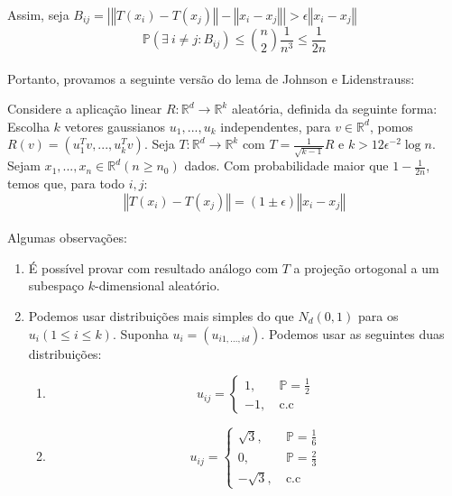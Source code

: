 \paragraph{}Assim, seja $B_{ij} = \left\vert \left\Vert T(x_i) - T(x_j) \right\Vert - \left\Vert x_i - x_j \right\Vert \right\vert > \epsilon\left\Vert x_i - x_j \right\Vert$
\begin{equation*}
    \mathbb{P}(\exists\> i \neq j : B_{ij}) \leq \binom{n}{2}\frac{1}{n^3} \leq \frac{1}{2n}
\end{equation*}
\paragraph{}Portanto, provamos a seguinte versão do lema de Johnson e Lidenstrauss:
\begin{teorema}
Considere a aplicação linear $R \colon \mathbb{R}^d \to \mathbb{R}^k$ aleatória, definida da seguinte forma: Escolha $k$ vetores gaussianos $u_1,...,u_k$ independentes, para $v \in \mathbb{R}^d$, pomos $R(v) = (u_1^Tv,...,u_k^Tv)$. Seja $T \colon \mathbb{R}^d \to \mathbb{R}^k$ com $T=\frac{1}{\sqrt{k-1}}R$ e $k > 12\epsilon^{-2}\log{n}$. Sejam $x_1,...,x_n \in \mathbb{R}^d (n \geq n_0)$ dados. Com probabilidade maior que $1 - \frac{1}{2n}$, temos que, para todo $i,j$:
\begin{equation*}
    \left\Vert T(x_i) - T(x_j) \right\Vert   = (1 \pm \epsilon)\left\Vert x_i - x_j \right\Vert
\end{equation*}
\end{teorema}

\paragraph{}Algumas observações:
\begin{enumerate}
    \item É possível provar com resultado análogo com $T$ a projeção ortogonal a um subespaço $k$-dimensional aleatório.
    \item Podemos usar distribuições mais simples do que $N_d(0,1)$ para os $u_i(1 \leq i \leq k)$. Suponha $u_i = (u_{i1,...,id})$. Podemos usar as seguintes duas distribuições:
    \begin{enumerate}
        \item 
        \[
                 u_{ij}=   \begin{cases} 
                        1,&\ \mathbb{P}=\frac{1}{2}\\ 
                        -1,&\ \text{c.c}\end{cases}
        \]
        \item
        \[
                 u_{ij}=   \begin{cases} 
                        \sqrt{3},&\ \mathbb{P}=\frac{1}{6}\\ 
                        0,&\ \mathbb{P}=\frac{2}{3} \\
                        -\sqrt{3},&\ \text{c.c}\end{cases}
        \]
    \end{enumerate}
\end{enumerate}

